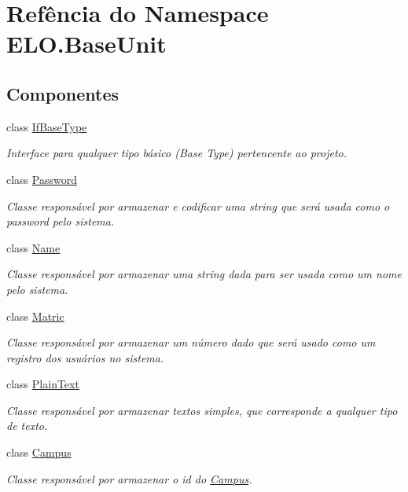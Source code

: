 \hypertarget{namespaceELO_1_1BaseUnit}{\section{Refência do Namespace E\-L\-O.\-Base\-Unit}
\label{dc/d21/namespaceELO_1_1BaseUnit}
}
\subsection*{Componentes}
\begin{DoxyCompactItemize}
\item 
class \hyperlink{classELO_1_1BaseUnit_1_1IfBaseType}{If\-Base\-Type}
\begin{DoxyCompactList}\small\item\em Interface para qualquer tipo básico (Base Type) pertencente ao projeto. \end{DoxyCompactList}\item 
class \hyperlink{classELO_1_1BaseUnit_1_1Password}{Password}
\begin{DoxyCompactList}\small\item\em Classe responsável por armazenar e codificar uma string que será usada como o password pelo sistema. \end{DoxyCompactList}\item 
class \hyperlink{classELO_1_1BaseUnit_1_1Name}{Name}
\begin{DoxyCompactList}\small\item\em Classe responsável por armazenar uma string dada para ser usada como um nome pelo sistema. \end{DoxyCompactList}\item 
class \hyperlink{classELO_1_1BaseUnit_1_1Matric}{Matric}
\begin{DoxyCompactList}\small\item\em Classe responsável por armazenar um número dado que será usado como um registro dos usuários no sistema. \end{DoxyCompactList}\item 
class \hyperlink{classELO_1_1BaseUnit_1_1PlainText}{Plain\-Text}
\begin{DoxyCompactList}\small\item\em Classe responsável por armazenar textos simples, que corresponde a qualquer tipo de texto. \end{DoxyCompactList}\item 
class \hyperlink{classELO_1_1BaseUnit_1_1Campus}{Campus}
\begin{DoxyCompactList}\small\item\em Classe responsável por armazenar o id do \hyperlink{classELO_1_1BaseUnit_1_1Campus}{Campus}. \end{DoxyCompactList}\item 

\end{DoxyCompactItemize}
